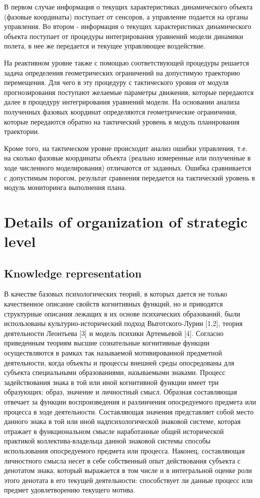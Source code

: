 \documentclass{svjour3}                     %
\begin{document}
В первом случае информация о текущих характеристиках динамического объекта (фазовые координаты) поступает от сенсоров, а управление подается на органы управления. Во втором - информация о текущих характеристиках динамического объекта поступает от процедуры интегрирования уравнений модели динамики полета, в нее же передается и текущее управляющее воздействие.

На реактивном уровне также с помощью соответствующей процедуры решается задача определения геометрических ограничений на допустимую траекторию перемещения. Для чего в эту процедуру с тактического уровня от модуля прогнозирования поступают желаемые параметры движения, которые передаются далее в процедуру интегрирования уравнений модели. На основании анализа полученных фазовых координат определяются геометрические ограничения, которые передаются обратно на тактический уровень в модуль планирования траектории.

Кроме того, на тактическом уровне происходит анализ ошибки управления, т.е.  на сколько фазовые координаты объекта (реально измеренные или полученные в ходе численного моделирования) отличаются от заданных. Ошибка сравнивается с допустимым порогом, результат сравнения передается на тактический уровень в модуль мониторинга выполнения плана.


\section{Details of organization of strategic level}
\label{sec:3}
\subsection{Knowledge representation}
В качестве базовых психологических теорий, в которых дается не только качественное описание свойств когнитивных функций, но и приводятся структурные описания лежащих в их основе психических образований, были использованы культурно-исторический подход Выготского-Лурии [1,2], теория деятельности Леонтьева [3] и модель психики Артемьевой [4]. Согласно приведенным теориям высшие сознательные когнитивные функции осуществляются в рамках так называемой мотивированной предметной деятельности, когда объекты и процессы внешней  среды опосредованы для субъекта специальными образованиями, называемыми знаками. Процесс задействования знака в той или иной когнитивной функции имеет три образующих: образ, значение и личностный смысл. Образная составляющая отвечает за функции воспроизведения и разлиичения опосредуемого предмета или процесса в ходе деятельности. Составляющая значения представляет собой место данного знака в той или иной надпсихологической знаковой системе, которая отражает в функциональном смысле наработанные общей исторической практикой коллектива-владельца данной знаковой системы способы использования опосредуемого предмета или процесса. Наконец, составляющая личностного смысла несет в себе собственный опыт действования субъекта с денотатом знака, который выражается в том числе и в интегральной оценке роли этого денотата в его текущей деятельности: способствует ли данные процесс или предмет удовлетворению текущего мотива.
\end{document}
